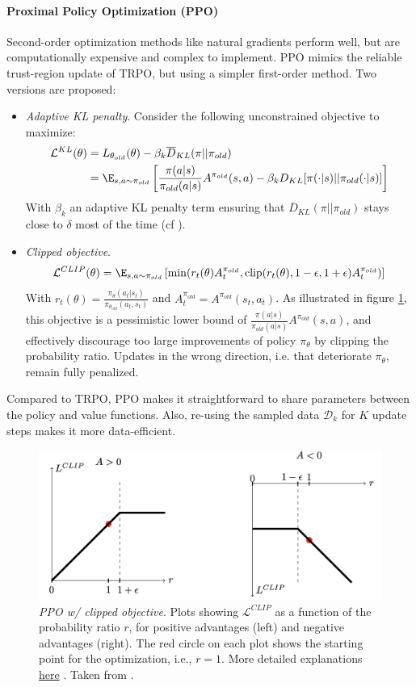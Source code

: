 \paragraph{Proximal Policy Optimization (PPO) \cite{schulman2017proximal}}
Second-order optimization methods like natural gradients perform well, but are computationally expensive and complex to implement. PPO mimics the reliable trust-region update of TRPO, but using a simpler first-order method. Two versions are proposed:
\begin{itemize}
    \item \emph{Adaptive KL penalty}. Consider the following unconstrained objective to maximize:
    \begin{align*}
        \mathcal{L}^{KL}(\theta) 
        &= L_{\theta_{old}}(\theta) - 
        \beta_k \overline{D}_{KL}(\pi||\pi_{old}) \\
        &= \E_{s,a\sim \pi_{old}} \left[
            \frac{\pi(a|s)}{\pi_{old}(a|s)} A^{\pi_{old}}(s,a)
            - \beta_k D_{KL}[\pi(\cdot|s)||\pi_{old}(\cdot|s)]
        \right]
    \end{align*}
    With $\beta_k$ an adaptive KL penalty term ensuring that $\overline{D}_{KL}(\pi||\pi_{old})$ stays close to $\delta$ most of the time (cf ).
    \item \emph{Clipped objective}.
    \[
        \mathcal{L}^{CLIP}(\theta) 
        = \E_{s,a\sim \pi_{old}} \left[
            \min(r_t(\theta) A^{\pi_{old}}_t, \text{clip}(r_t(\theta), 1-\epsilon, 1+\epsilon) A^{\pi_{old}}_t)
        \right]
    \]
    With $r_t(\theta) = \frac{\pi_\theta(a_t|s_t)}{\pi_{\theta_{old}}(a_t,s_t)}$ and $A^{\pi_{old}}_t = A^{\pi_{old}}(s_t,a_t)$. As illustrated in figure \ref{fig:ppo-clip}, this objective is a pessimistic lower bound of $\frac{\pi(a|s)}{\pi_{old}(a|s)} A^{\pi_{old}}(s,a)$, and effectively discourage too large improvements of policy $\pi_\theta$ by clipping the probability ratio. Updates in the wrong direction, i.e. that deteriorate $\pi_\theta$, remain fully penalized. 
\end{itemize}
Compared to TRPO, PPO makes it straightforward to share parameters between the policy and value functions. Also, re-using the sampled data $\mathcal{D}_k$ for $K$ update steps makes it more data-efficient.

\begin{figure}
    \centering
    \includegraphics[width=0.5\linewidth]{figures/ppo-clip.png}
    \caption{\emph{PPO w/ clipped objective}. Plots showing $\mathcal{L}^{CLIP}$ as a function of the probability ratio $r$, for positive advantages (left) and negative advantages (right). The red circle on each plot shows the starting point for the optimization, i.e., $r=1$. More detailed explanations \href{https://stackoverflow.com/a/50663200}{here} \cite{blog-ppo-clip}. Taken from \cite{schulman2017proximal}.}
    \label{fig:ppo-clip}
\end{figure}

